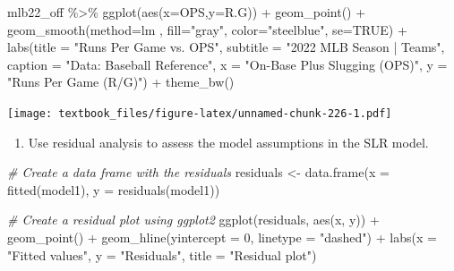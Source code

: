 \documentclass[
  11pt,
]{book}
\newenvironment{Shaded}{\begin{snugshade}}{\end{snugshade}}
\newcommand{\AttributeTok}[1]{\textcolor[rgb]{0.77,0.63,0.00}{#1}}
\newcommand{\CommentTok}[1]{\textcolor[rgb]{0.56,0.35,0.01}{\textit{#1}}}
\newcommand{\ConstantTok}[1]{\textcolor[rgb]{0.00,0.00,0.00}{#1}}
\newcommand{\DecValTok}[1]{\textcolor[rgb]{0.00,0.00,0.81}{#1}}
\newcommand{\FunctionTok}[1]{\textcolor[rgb]{0.00,0.00,0.00}{#1}}
\newcommand{\NormalTok}[1]{#1}
\newcommand{\OtherTok}[1]{\textcolor[rgb]{0.56,0.35,0.01}{#1}}
\newcommand{\SpecialCharTok}[1]{\textcolor[rgb]{0.00,0.00,0.00}{#1}}
\newcommand{\StringTok}[1]{\textcolor[rgb]{0.31,0.60,0.02}{#1}}
\providecommand{\tightlist}{%
  \setlength{\itemsep}{0pt}\setlength{\parskip}{0pt}}
\theoremstyle{definition}
\theoremstyle{definition}
\theoremstyle{definition}
\theoremstyle{definition}
\theoremstyle{remark}
\begin{document}
\begin{Shaded}
\begin{Highlighting}[]
\NormalTok{mlb22\_off }\SpecialCharTok{\%\textgreater{}\%} \FunctionTok{ggplot}\NormalTok{(}\FunctionTok{aes}\NormalTok{(}\AttributeTok{x=}\NormalTok{OPS,}\AttributeTok{y=}\NormalTok{R.G)) }\SpecialCharTok{+} \FunctionTok{geom\_point}\NormalTok{() }\SpecialCharTok{+}
  \FunctionTok{geom\_smooth}\NormalTok{(}\AttributeTok{method=}\NormalTok{lm , }\AttributeTok{fill=}\StringTok{"gray"}\NormalTok{, }\AttributeTok{color=}\StringTok{"steelblue"}\NormalTok{, }\AttributeTok{se=}\ConstantTok{TRUE}\NormalTok{) }\SpecialCharTok{+}
  \FunctionTok{labs}\NormalTok{(}\AttributeTok{title =} \StringTok{"Runs Per Game vs. OPS"}\NormalTok{,}
       \AttributeTok{subtitle =} \StringTok{"2022 MLB Season | Teams"}\NormalTok{,}
       \AttributeTok{caption =} \StringTok{"Data: Baseball Reference"}\NormalTok{, }
       \AttributeTok{x =} \StringTok{"On{-}Base Plus Slugging (OPS)"}\NormalTok{,}
       \AttributeTok{y =} \StringTok{"Runs Per Game (R/G)"}\NormalTok{) }\SpecialCharTok{+}
  \FunctionTok{theme\_bw}\NormalTok{()}
\end{Highlighting}
\end{Shaded}

\texttt{[image: textbook\_files/figure-latex/unnamed-chunk-226-1.pdf]}

\newpage

\begin{enumerate}
\def\labelenumi{(\alph{enumi})}
\setcounter{enumi}{4}
\tightlist
\item
  Use residual analysis to assess the model assumptions in the SLR model.
\end{enumerate}

\begin{Shaded}
\begin{Highlighting}[]
\CommentTok{\# Create a data frame with the residuals}
\NormalTok{residuals }\OtherTok{\textless{}{-}} \FunctionTok{data.frame}\NormalTok{(}\AttributeTok{x =} \FunctionTok{fitted}\NormalTok{(model1), }\AttributeTok{y =} \FunctionTok{residuals}\NormalTok{(model1))}

\CommentTok{\# Create a residual plot using ggplot2}
\FunctionTok{ggplot}\NormalTok{(residuals, }\FunctionTok{aes}\NormalTok{(x, y)) }\SpecialCharTok{+}
  \FunctionTok{geom\_point}\NormalTok{() }\SpecialCharTok{+}
  \FunctionTok{geom\_hline}\NormalTok{(}\AttributeTok{yintercept =} \DecValTok{0}\NormalTok{, }\AttributeTok{linetype =} \StringTok{"dashed"}\NormalTok{) }\SpecialCharTok{+}
  \FunctionTok{labs}\NormalTok{(}\AttributeTok{x =} \StringTok{"Fitted values"}\NormalTok{, }\AttributeTok{y =} \StringTok{"Residuals"}\NormalTok{, }\AttributeTok{title =} \StringTok{"Residual plot"}\NormalTok{)}
\end{Highlighting}
\end{Shaded}
\end{document}

